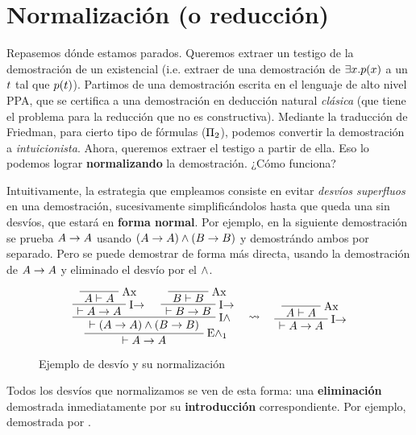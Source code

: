 \section{Normalización (o reducción)}
\label{fri:sec:reduction}

Repasemos dónde estamos parados. Queremos extraer un testigo de la demostración de un existencial (i.e. extraer de una demostración de  $\exists x . p(x)$ a un $t$ tal que $p(t)$). Partimos de una demostración escrita en el lenguaje de alto nivel PPA, que se certifica a una demostración en deducción natural \textit{clásica} (que tiene el problema para la reducción que no es constructiva). Mediante la traducción de Friedman, para cierto tipo de fórmulas ($\Pi_{2}$), podemos convertir la demostración a \textit{intuicionista}. Ahora, queremos extraer el testigo a partir de ella. Eso lo podemos lograr \textbf{normalizando} la demostración. ¿Cómo funciona?

Intuitivamente, la estrategia que empleamos consiste en evitar \textit{desvíos superfluos} en una demostración, sucesivamente simplificándolos hasta que queda una sin desvíos, que estará en \textbf{forma normal}. Por ejemplo, en la siguiente demostración se prueba $A \to A$ usando $(A \to A) \wedge (B \to B)$ y demostrándo ambos por separado. Pero se puede demostrar de forma más directa, usando la demostración de $A \to A$ y eliminado el desvío por el $\wedge$.

\begin{figure}[H]
\[
    \AxiomC{}
    \RL{\ruleAx}
    \UnaryInfC{$\form \judG \form$}
    \RL{\ruleImpI}
    \UnaryInfC{$\judG \form \fImp \form$}
    \AxiomC{}
    \RL{\ruleAx}
    \UnaryInfC{$\formTwo \judG \formTwo$}
    \RL{\ruleImpI}
    \UnaryInfC{$\judG \formTwo \fImp \formTwo$}
    \RL{\ruleAndI}
    \BinaryInfC{$\judG (\form \fImp \form) \fAnd (\formTwo \fImp \formTwo)$}
    \RL{\ruleAndEOne{}}
    \UnaryInfC{$\judG \form \fImp \form$}
\DisplayProof
\quad
\rewrite
\quad
    \AxiomC{}
    \RL{\ruleAx}
    \UnaryInfC{$\form \judG \form$}
    \RL{\ruleImpI}
    \UnaryInfC{$\judG \form \fImp \form$}
    \DisplayProof
\]
\caption{Ejemplo de desvío y su normalización}
\end{figure}

Todos los desvíos que normalizamos se ven de esta forma: una \textbf{eliminación} demostrada inmediatamente por su \textbf{introducción} correspondiente. Por ejemplo,  demostrada por .

